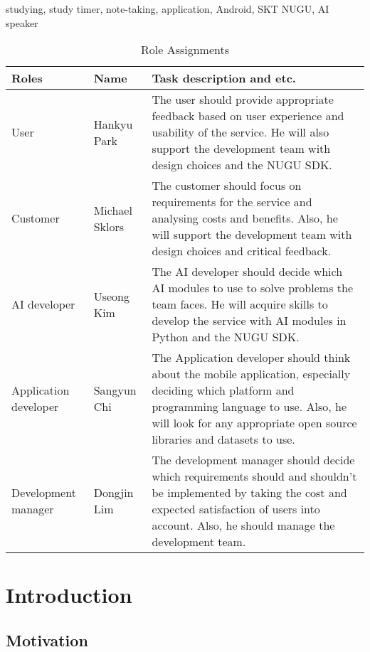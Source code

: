 \documentclass[conference]{IEEEtran}
\begin{document}
\begin{IEEEkeywords}
studying, study timer, note-taking, application, Android, SKT NUGU, AI speaker
\end{IEEEkeywords}

\begin{table}[htbp]
\caption{Role Assignments}
\begin{center}
\begin{tabular}{|p{1.25cm}|p{1cm}|p{5.25cm}|}
\hline
\textbf{Roles} & \textbf{Name} & \textbf{Task description and etc.} \\
\hline
User & Hankyu Park & The user should provide appropriate feedback based on user experience and usability of the service. He will also support the development team with design choices and the NUGU SDK. \\
\hline
Customer & Michael Sklors & The customer should focus on requirements for the service and analysing costs and benefits. Also, he will support the development team with design choices and critical feedback. \\
\hline
AI developer & Useong Kim & The AI developer should decide which AI modules to use to solve problems the team faces. He will acquire skills to develop the service with AI modules in Python and the NUGU SDK. \\
\hline
Application developer & Sangyun Chi & The Application developer should think about the mobile application, especially deciding which platform and programming language to use. Also, he will look for any appropriate open source libraries and datasets to use. \\
\hline
Development manager & Dongjin Lim & The development manager should decide which requirements should and shouldn’t be implemented by taking the cost and expected satisfaction of users into account. Also, he should manage the development team. \\
\hline
\end{tabular}
\end{center}
\end{table}

\section{Introduction}

\subsection{Motivation}
\end{document}
